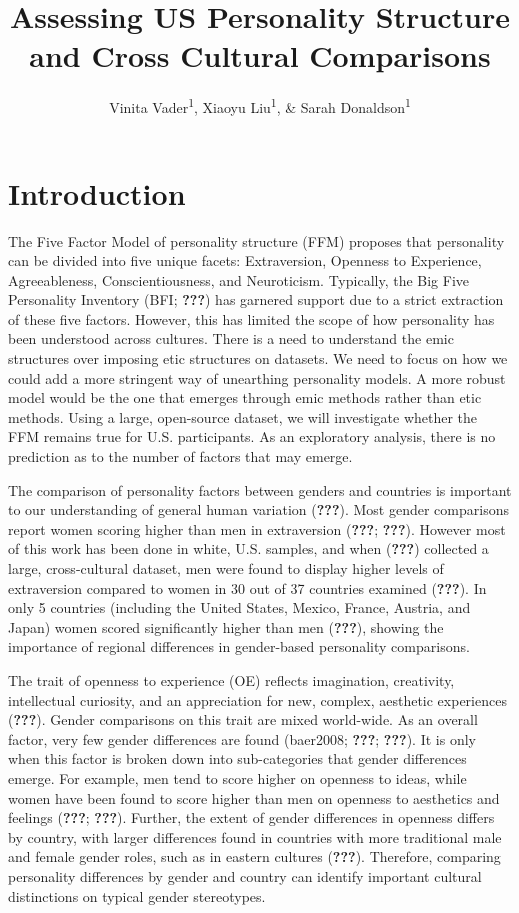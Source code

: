 \documentclass[
  english,
  man]{apa6}
\title{Assessing US Personality Structure and Cross Cultural Comparisons}
\author{Vinita Vader\textsuperscript{1}, Xiaoyu Liu\textsuperscript{1}, \& Sarah Donaldson\textsuperscript{1}}
\date{}
\affiliation{\vspace{0.5cm}\textsuperscript{1} University of Oregon}
\begin{document}
\maketitle

\hypertarget{introduction}{%
\section{Introduction}\label{introduction}}

The Five Factor Model of personality structure (FFM) proposes that personality can be divided into five unique facets: Extraversion, Openness to Experience, Agreeableness, Conscientiousness, and Neuroticism. Typically, the Big Five Personality Inventory (BFI; {\textbf{???}}) has garnered support due to a strict extraction of these five factors. However, this has limited the scope of how personality has been understood across cultures. There is a need to understand the emic structures over imposing etic structures on datasets. We need to focus on how we could add a more stringent way of unearthing personality models. A more robust model would be the one that emerges through emic methods rather than etic methods. Using a large, open-source dataset, we will investigate whether the FFM remains true for U.S. participants. As an exploratory analysis, there is no prediction as to the number of factors that may emerge.

The comparison of personality factors between genders and countries is important to our understanding of general human variation ({\textbf{???}}). Most gender comparisons report women scoring higher than men in extraversion ({\textbf{???}}; {\textbf{???}}). However most of this work has been done in white, U.S. samples, and when ({\textbf{???}}) collected a large, cross-cultural dataset, men were found to display higher levels of extraversion compared to women in 30 out of 37 countries examined ({\textbf{???}}). In only 5 countries (including the United States, Mexico, France, Austria, and Japan) women scored significantly higher than men ({\textbf{???}}), showing the importance of regional differences in gender-based personality comparisons.

The trait of openness to experience (OE) reflects imagination, creativity, intellectual curiosity, and an appreciation for new, complex, aesthetic experiences ({\textbf{???}}). Gender comparisons on this trait are mixed world-wide. As an overall factor, very few gender differences are found (baer2008; {\textbf{???}}; {\textbf{???}}). It is only when this factor is broken down into sub-categories that gender differences emerge. For example, men tend to score higher on openness to ideas, while women have been found to score higher than men on openness to aesthetics and feelings ({\textbf{???}}; {\textbf{???}}). Further, the extent of gender differences in openness differs by country, with larger differences found in countries with more traditional male and female gender roles, such as in eastern cultures ({\textbf{???}}). Therefore, comparing personality differences by gender and country can identify important cultural distinctions on typical gender stereotypes.
\end{document}
